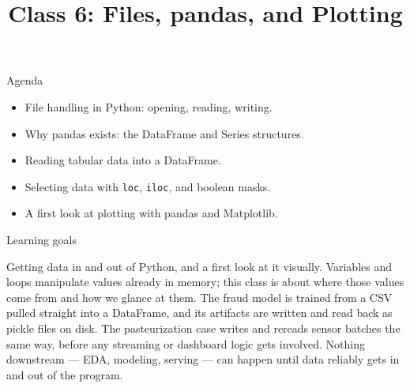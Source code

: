 

\title{Class 6: Files, pandas, and Plotting}
\author{\coursename}
\date{}



\frame{\titlepage \coursefooter}

\begin{frame}{Agenda}
\begin{itemize}
\item File handling in Python: opening, reading, writing.
\item Why pandas exists: the DataFrame and Series structures.
\item Reading tabular data into a DataFrame.
\item Selecting data with \texttt{loc}, \texttt{iloc}, and boolean masks.
\item A first look at plotting with pandas and Matplotlib.
\end{itemize}
\coursefooter
\end{frame}

\begin{frame}{Learning goals}
\coursefooter
\end{frame}

\coursecontextframe
{Getting data in and out of Python, and a first look at it visually.}
{Variables and loops manipulate values already in memory; this class is about where those values come from and how we glance at them.}
{The fraud model is trained from a CSV pulled straight into a DataFrame, and its artifacts are written and read back as pickle files on disk.}
{The pasteurization case writes and rereads sensor batches the same way, before any streaming or dashboard logic gets involved.}
{Nothing downstream --- EDA, modeling, serving --- can happen until data reliably gets in and out of the program.}


